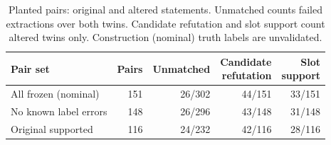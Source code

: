 \begin{table}[t]
\centering\caption{Planted pairs: original and altered statements. Unmatched counts failed extractions over both twins. Candidate refutation and slot support count altered twins only. Construction (nominal) truth labels are unvalidated.}
\label{tab:planted}\footnotesize\setlength{\tabcolsep}{3pt}
\begin{tabular}{@{}lrrrr@{}}\toprule
Pair set & Pairs & Unmatched & \shortstack{Candidate\\refutation} & \shortstack{Slot\\support} \\\midrule
All frozen (nominal) & 151 & 26/302 & 44/151 & 33/151 \\
No known label errors & 148 & 26/296 & 43/148 & 31/148 \\
Original supported & 116 & 24/232 & 42/116 & 28/116 \\
\bottomrule\end{tabular}\end{table}
